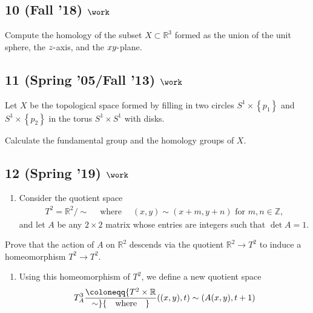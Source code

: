 \hypertarget{fall-18-work-4}{%
\subsection{\texorpdfstring{10 (Fall '18)
\(\work\)}{10 (Fall '18) \textbackslash work}}\label{fall-18-work-4}}

Compute the homology of the subset \(X \subset {\mathbb{R}}^3\) formed
as the union of the unit sphere, the \(z{\hbox{-}}\)axis, and the
\(xy{\hbox{-}}\)plane.

\hypertarget{spring-05fall-13-work}{%
\subsection{\texorpdfstring{11 (Spring '05/Fall '13)
\(\work\)}{11 (Spring '05/Fall '13) \textbackslash work}}\label{spring-05fall-13-work}}

Let \(X\) be the topological space formed by filling in two circles
\(S^1 \times \left\{{p_1 }\right\}\) and
\(S^1 \times \left\{{p_2 }\right\}\) in the torus \(S^1 \times S^1\)
with disks.

Calculate the fundamental group and the homology groups of \(X\).

\hypertarget{spring-19-work-1}{%
\subsection{\texorpdfstring{12 (Spring '19)
\(\work\)}{12 (Spring '19) \textbackslash work}}\label{spring-19-work-1}}

\begin{enumerate}
\def\labelenumi{\alph{enumi}.}
\tightlist
\item
  Consider the quotient space
  \begin{align*}
  T^2 = {\mathbb{R}}^2 / \sim {\quad \operatorname{where} \quad} (x, y) \sim (x + m, y + n) \text{ for } m, n \in {\mathbb{Z}}
  ,\end{align*}
  and let \(A\) be any \(2 \times 2\) matrix whose entries are integers
  such that \(\det A = 1\).
\end{enumerate}

Prove that the action of \(A\) on \({\mathbb{R}}^2\) descends via the
quotient \({\mathbb{R}}^2 \to T^2\) to induce a homeomorphism
\(T^2 \to T^2\).

\begin{enumerate}
\def\labelenumi{\alph{enumi}.}
\setcounter{enumi}{1}
\tightlist
\item
  Using this homeomorphism of \(T^2\), we define a new quotient space
  \begin{align*}
  T_A^3 \coloneqq{T^2\times{\mathbb{R}}\over \sim} {\quad \operatorname{where} \quad} ((x, y), t) \sim (A(x, y), t + 1)
  \end{align*}
\end{enumerate}

